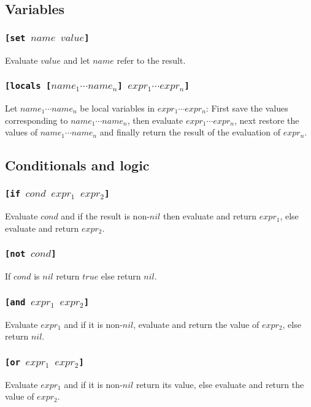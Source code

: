 \subsection{Variables}
\subsubsection{\tt{[set }$name$ $value$\tt{]}}
Evaluate $value$ and let $name$ refer to the result.

\subsubsection{\tt{[locals [}$name_1 \cdots name_n$\tt{]} $expr_1 \cdots expr_n$\tt{]}}
Let $name_1 \cdots name_n$ be local variables in $expr_1 \cdots expr_n$: First save the values corresponding to $name_1 \cdots name_n$, then evaluate $expr_1 \cdots expr_n$, next restore the values of $name_1 \cdots name_n$ and finally return the result of the evaluation of $expr_n$.

\subsection{Conditionals and logic}
\subsubsection{\tt{[if }$cond$ $expr_1$ $expr_2$\tt{]}}
Evaluate $cond$ and if the result is non-$nil$ then evaluate and return $expr_1$, else evaluate and return $expr_2$.

\subsubsection{\tt{[not }$cond$\tt{]}}
If $cond$ is $nil$ return $true$ else return $nil$.

\subsubsection{\tt{[and }$expr_1$ $expr_2$\tt{]}}
Evaluate $expr_1$ and if it is non-$nil$, evaluate and return the value of $expr_2$, else return $nil$.

\subsubsection{\tt{[or }$expr_1$ $expr_2$\tt{]}}
Evaluate $expr_1$ and if it is non-$nil$ return its value, else evaluate and return the value of $expr_2$.

